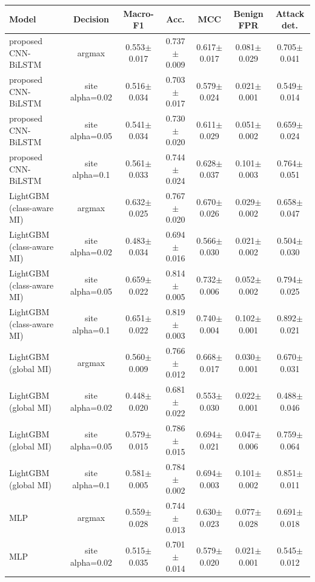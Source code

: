 \begin{tabular}{lcccccc}
\toprule
Model & Decision & Macro-F1 & Acc. & MCC & Benign FPR & Attack det. \\
\midrule
proposed CNN-BiLSTM & argmax & 0.553$\pm$0.017 & 0.737$\pm$0.009 & 0.617$\pm$0.017 & 0.081$\pm$0.029 & 0.705$\pm$0.041 \\
proposed CNN-BiLSTM & site alpha=0.02 & 0.516$\pm$0.034 & 0.703$\pm$0.017 & 0.579$\pm$0.024 & 0.021$\pm$0.001 & 0.549$\pm$0.014 \\
proposed CNN-BiLSTM & site alpha=0.05 & 0.541$\pm$0.034 & 0.730$\pm$0.020 & 0.611$\pm$0.029 & 0.051$\pm$0.002 & 0.659$\pm$0.024 \\
proposed CNN-BiLSTM & site alpha=0.1 & 0.561$\pm$0.033 & 0.744$\pm$0.024 & 0.628$\pm$0.037 & 0.101$\pm$0.003 & 0.764$\pm$0.051 \\
LightGBM (class-aware MI) & argmax & 0.632$\pm$0.025 & 0.767$\pm$0.020 & 0.670$\pm$0.026 & 0.029$\pm$0.002 & 0.658$\pm$0.047 \\
LightGBM (class-aware MI) & site alpha=0.02 & 0.483$\pm$0.034 & 0.694$\pm$0.016 & 0.566$\pm$0.030 & 0.021$\pm$0.002 & 0.504$\pm$0.030 \\
LightGBM (class-aware MI) & site alpha=0.05 & 0.659$\pm$0.022 & 0.814$\pm$0.005 & 0.732$\pm$0.006 & 0.052$\pm$0.002 & 0.794$\pm$0.025 \\
LightGBM (class-aware MI) & site alpha=0.1 & 0.651$\pm$0.022 & 0.819$\pm$0.003 & 0.740$\pm$0.004 & 0.102$\pm$0.001 & 0.892$\pm$0.021 \\
LightGBM (global MI) & argmax & 0.560$\pm$0.009 & 0.766$\pm$0.012 & 0.668$\pm$0.017 & 0.030$\pm$0.001 & 0.670$\pm$0.031 \\
LightGBM (global MI) & site alpha=0.02 & 0.448$\pm$0.020 & 0.681$\pm$0.022 & 0.553$\pm$0.030 & 0.022$\pm$0.001 & 0.488$\pm$0.046 \\
LightGBM (global MI) & site alpha=0.05 & 0.579$\pm$0.015 & 0.786$\pm$0.015 & 0.694$\pm$0.021 & 0.047$\pm$0.006 & 0.759$\pm$0.064 \\
LightGBM (global MI) & site alpha=0.1 & 0.581$\pm$0.005 & 0.784$\pm$0.002 & 0.694$\pm$0.003 & 0.101$\pm$0.002 & 0.851$\pm$0.011 \\
MLP & argmax & 0.559$\pm$0.028 & 0.744$\pm$0.013 & 0.630$\pm$0.023 & 0.077$\pm$0.028 & 0.691$\pm$0.018 \\
MLP & site alpha=0.02 & 0.515$\pm$0.035 & 0.701$\pm$0.014 & 0.579$\pm$0.020 & 0.021$\pm$0.001 & 0.545$\pm$0.012 \\

\end{tabular}
